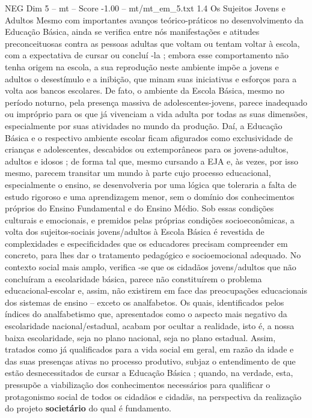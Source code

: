 \begin{textsample}{NEG Dim 5 – mt – Score -1.00 – mt/mt\_em\_5.txt}  \label{ex:f5_neg_209}
1.4 Os Sujeitos Jovens e Adultos Mesmo com importantes avanços teórico-práticos no desenvolvimento da Educação Básica, ainda se verifica entre nós manifestações e atitudes preconceituosas contra as pessoas adultas que voltam ou tentam voltar à escola, com a expectativa de cursar ou concluí -la ; embora esse comportamento não tenha origem na escola, a sua reprodução neste ambiente impõe a jovens e adultos o desestímulo e a inibição, que minam suas iniciativas e esforços para a volta aos bancos escolares.
De fato, o ambiente da Escola Básica, mesmo no período noturno, pela presença massiva de adolescentes-jovens, parece inadequado ou impróprio para os que já vivenciam a vida adulta por todas as suas dimensões, especialmente por suas atividades no mundo da produção.
Daí, a Educação Básica e o respectivo ambiente escolar ficam afigurados como exclusividade de crianças e adolescentes, descabidos ou extemporâneos para os jovens-adultos, adultos e idosos ; de forma tal que, mesmo cursando a EJA e, às vezes, por isso mesmo, parecem transitar um mundo à parte cujo processo educacional, especialmente o ensino, se desenvolveria por uma lógica que toleraria a falta de estudo rigoroso e uma aprendizagem menor, sem o domínio dos conhecimentos próprios do Ensino Fundamental e do Ensino Médio.
Sob essas condições culturais e emocionais, e premidos pelas próprias condições socioeconômicas, a volta dos sujeitos-sociais jovens/adultos à Escola Básica é revestida de complexidades e especificidades que os educadores precisam compreender em concreto, para lhes dar o tratamento pedagógico e socioemocional adequado.
No contexto social mais amplo, verifica -se que os cidadãos jovens/adultos que não concluíram a escolaridade básica, parece não constituírem o problema educacional-escolar e, assim, não existirem em face das preocupações educacionais dos sistemas de ensino – exceto os analfabetos.
Os quais, identificados pelos índices do analfabetismo que, apresentados como o aspecto mais negativo da escolaridade nacional/estadual, acabam por ocultar a realidade, isto é, a nossa baixa escolaridade, seja no plano nacional, seja no plano estadual.
Assim, tratados como já qualificados para a vida social em geral, em razão da idade e das suas presenças ativas no processo produtivo, subjaz o entendimento de que estão desnecessitados de cursar a Educação Básica ; quando, na verdade, esta, pressupõe a viabilização dos conhecimentos necessários para qualificar o protagonismo social de todos os cidadãos e cidadãs, na perspectiva da realização do projeto \textbf{societário} do qual é fundamento.

\end{textsample}
